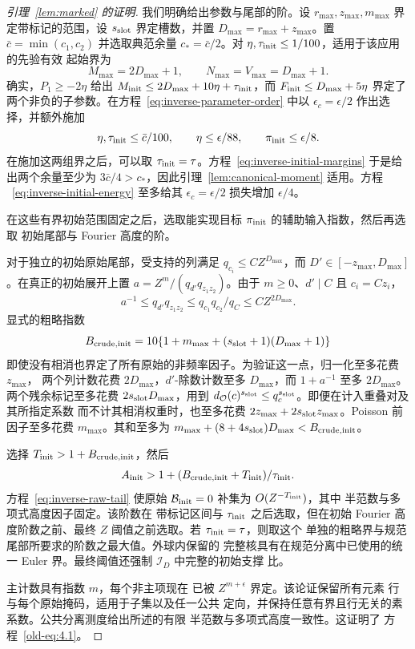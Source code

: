 \documentclass[11pt,a4paper]{article}
\numberwithin{equation}{section}
\numberwithin{figure}{section}
\theoremstyle{definition}
\theoremstyle{remark}
\begin{document}
\begin{proof}[引理~\ref{lem:marked} 的证明]
我们明确给出参数与尾部的阶。设 \(r_{\max},z_{\max},m_{\max}\) 界定带标记的范围，设
\(s_{\rm slot}\) 界定槽数，并置 \(D_{\max}=r_{\max}+z_{\max}\)。置 \(\bar c=\min(c_1,c_2)\)
并选取典范余量 \(c_*=\bar c/2\)。对 \(\eta,\tau_{\rm init}\le1/100\)，适用于该应用的先验有效
起始界为
\[
 M_{\max}=2D_{\max}+1,\qquad N_{\max}=V_{\max}=D_{\max}+1.
\]
确实，\(P_1\ge-2\eta\) 给出 \(M_{\rm init}\le2D_{\max}+10\eta+\tau_{\rm init}\)，而
\(F_{\rm init}\le D_{\max}+5\eta\) 界定了两个非负的子参数。在方程~\eqref{eq:inverse-parameter-order}
中以 \(\epsilon_c=\epsilon/2\) 作出选择，并额外施加
\[
 \eta,\tau_{\rm init}\le\bar c/100,\qquad
 \eta\le\epsilon/88,\qquad \pi_{\rm init}\le\epsilon/8.
\]
在施加这两组界之后，可以取 \(\tau_{\rm init}=\tau\)。方程~\eqref{eq:inverse-initial-margins}
于是给出两个余量至少为 \(3\bar c/4>c_*\)，因此引理~\ref{lem:canonical-moment} 适用。方程
~\eqref{eq:inverse-initial-energy} 至多给其 \(\epsilon_c=\epsilon/2\) 损失增加 \(\epsilon/4\)。

在这些有界初始范围固定之后，选取能实现目标 \(\pi_{\rm init}\) 的辅助输入指数，然后再选取
初始尾部与 Fourier 高度的阶。

对于独立的初始原始尾部，受支持的列满足 \(q_{c_i}\le C Z^{D_{\max}}\)，而
\(D'\in[-z_{\max},D_{\max}]\)。在真正的初始展开上置 \(a=Z^m/(q_{d'}q_{z_1z_2})\)。由于
\(m\ge0\)、\(d'\mid C\) 且 \(c_i=Cz_i\)，
\[
 a^{-1}\le q_{d'}q_{z_1z_2}
       \le q_{c_1}q_{c_2}/q_C\le C Z^{2D_{\max}}.
\]
显式的粗略指数
\[
 B_{\rm crude,init}=10\{1+m_{\max}+(s_{\rm slot}+1)(D_{\max}+1)\}
\]
即使没有相消也界定了所有原始的非频率因子。为验证这一点，归一化至多花费 \(z_{\max}\)，
两个列计数花费 \(2D_{\max}\)，\(d'\)-除数计数至多 \(D_{\max}\)，而 \(1+a^{-1}\) 至多
\(2D_{\max}\)。两个残余标记至多花费 \(2s_{\rm slot}D_{\max}\)，用到
\(d_{\mathcal O}(c)^{s_{\rm slot}}\le q_c^{s_{\rm slot}}\)。即便在计入重叠对及其所指定系数
而不计其相消权重时，也至多花费 \(2z_{\max}+2s_{\rm slot}z_{\max}\)。Poisson 前因子至多花费
\(m_{\max}\)。其和至多为
\(m_{\max}+(8+4s_{\rm slot})D_{\max}<B_{\rm crude,init}\)。

选择 \(T_{\rm init}>1+B_{\rm crude,init}\)，然后
\[
 A_{\rm init}>1+(B_{\rm crude,init}+T_{\rm init})/\tau_{\rm init}.
\]
方程~\eqref{eq:inverse-raw-tail} 使原始
\(\mathcal B_{\rm init}=0\) 补集为 \(O(Z^{-T_{\rm init}})\)，其中
半范数与多项式高度因子固定。该阶数在
带标记区间与 \(\tau_{\rm init}\) 之后选取，但在初始
Fourier 高度阶数之前、最终 \(Z\) 阈值之前选取。若
\(\tau_{\rm init}=\tau\)，则取这个
单独的粗略界与规范尾部所要求的阶数之最大值。外球内保留的
完整核具有在规范分离中已使用的统一 Euler 界。最终阈值还强制
\(\mathcal I_D\) 中完整的初始支撑
比。

主计数具有指数 \(m\)，每个非主项现在
已被 \(Z^{m+\epsilon}\) 界定。该论证保留所有元素
行与每个原始掩码，适用于子集以及任一公共
定向，并保持任意有界且行无关的素
系数。公共分离测度给出所述的有限
半范数与多项式高度一致性。这证明了
方程~\eqref{old-eq:4.1}。
\end{proof}
\end{document}
